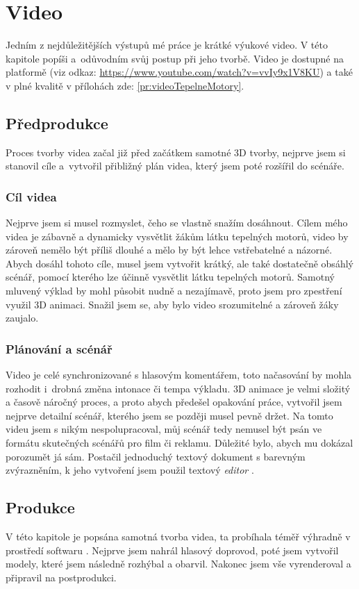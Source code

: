\section{Video}
{Jedním z nejdůležitějších výstupů mé práce je krátké výukové video. V této kapitole popíši a~odůvodním svůj postup při jeho tvorbě. Video je dostupné na platformě  (viz odkaz: \href{https://www.youtube.com/watch?v=vvIy9x1V8KU}{https://www.youtube.com/watch?v=vvIy9x1V8KU}) a také v plné kvalitě v přílohách zde: \ref{pr:videoTepelneMotory}.}
\subsection{Předprodukce}
{Proces tvorby videa začal již před začátkem samotné 3D tvorby, nejprve jsem si stanovil cíle a~vytvořil přibližný plán videa, který jsem poté rozšířil do scénáře.}
\subsubsection{Cíl videa}
{Nejprve jsem si musel rozmyslet, čeho se vlastně snažím dosáhnout. Cílem mého videa je zábavně a dynamicky vysvětlit žákům látku tepelných motorů, video by zároveň nemělo být příliš dlouhé a mělo by být lehce vstřebatelné a názorné.}\odst
{Abych dosáhl tohoto cíle, musel jsem vytvořit krátký, ale také dostatečně obsáhlý scénář, pomocí kterého lze účinně vysvětlit látku tepelných motorů. Samotný mluvený výklad by mohl působit nudně a nezajímavě, proto jsem pro zpestření využil 3D animaci. Snažil jsem se, aby bylo video srozumitelné a zároveň žáky zaujalo.}
\subsubsection{Plánování a scénář}
{Video je celé synchronizované s hlasovým komentářem, toto načasování by mohla rozhodit i~drobná změna intonace či tempa výkladu. 3D animace je velmi složitý a časově náročný proces, a proto abych předešel opakování práce, vytvořil jsem nejprve detailní scénář, kterého jsem se později musel pevně držet.}\odst
{Na tomto videu jsem s nikým nespolupracoval, můj scénář tedy nemusel být psán ve formátu skutečných scénářů pro film či reklamu. Důležité bylo, abych mu dokázal porozumět já sám. Postačil jednoduchý textový dokument s barevným zvýrazněním, k jeho vytvoření jsem použil textový \textit{editor} .}
\newpage
\subsection{Produkce}
{V této kapitole je popsána samotná tvorba videa, ta probíhala téměř výhradně v prostředí softwaru . Nejprve jsem nahrál hlasový doprovod, poté jsem vytvořil modely, které jsem následně rozhýbal a obarvil. Nakonec jsem vše vyrenderoval a připravil na postprodukci.}
